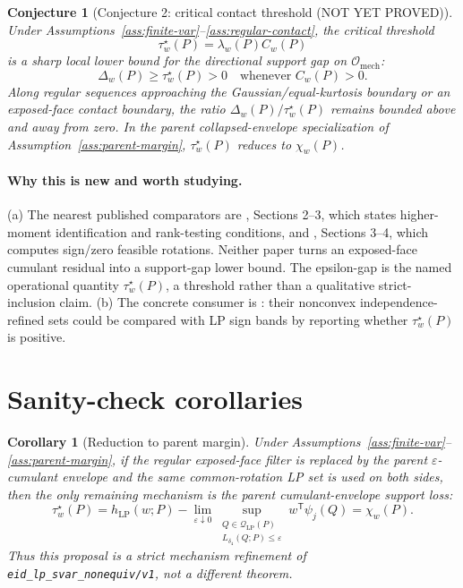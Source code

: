 \documentclass[11pt]{article}
\newcommand{\transpose}{\mathsf{T}}
\theoremstyle{definition}
\theoremstyle{plain}
\newtheorem{conjecture}{Conjecture}
\newtheorem{corollary}{Corollary}
\theoremstyle{remark}
\begin{document}
\begin{conjecture}[Conjecture 2: critical contact threshold (NOT YET PROVED)]\label{conj:critical-threshold}
Under Assumptions~\ref{ass:finite-var}--\ref{ass:regular-contact}, the critical threshold
\[
\tau_w^\star(P)=\lambda_w(P)C_w(P)
\]
is a sharp local lower bound for the directional support gap on \(\mathcal O_{\mathrm{mech}}\):
\[
\Delta_w(P)\ge \tau_w^\star(P)>0\quad\text{whenever }C_w(P)>0.
\]
Along regular sequences approaching the Gaussian/equal-kurtosis boundary or an exposed-face contact boundary, the ratio \(\Delta_w(P)/\tau_w^\star(P)\) remains bounded above and away from zero.  In the parent collapsed-envelope specialization of Assumption~\ref{ass:parent-margin}, \(\tau_w^\star(P)\) reduces to \(\chi_w(P)\).
\end{conjecture}
\paragraph{Why this is new and worth studying.}
(a) The nearest published comparators are \citet{Guay2021}, Sections 2--3, which states higher-moment identification and rank-testing conditions, and \citet{Read2022}, Sections 3--4, which computes sign/zero feasible rotations.  Neither paper turns an exposed-face cumulant residual into a support-gap lower bound.  The epsilon-gap is the named operational quantity \(\tau_w^\star(P)\), a threshold rather than a qualitative strict-inclusion claim.  (b) The concrete consumer is \citet{DrautzburgWright2023}: their nonconvex independence-refined sets could be compared with LP sign bands by reporting whether \(\tau_w^\star(P)\) is positive.

\section{Sanity-check corollaries}
\begin{corollary}[Reduction to parent margin]\label{cor:parent}
Under Assumptions~\ref{ass:finite-var}--\ref{ass:parent-margin}, if the regular exposed-face filter is replaced by the parent \(\varepsilon\)-cumulant envelope and the same common-rotation LP set is used on both sides, then the only remaining mechanism is the parent cumulant-envelope support loss:
\[
\tau_w^\star(P)=
h_{\mathrm{LP}}(w;P)-
\lim_{\varepsilon\downarrow0}
\sup_{\substack{Q\in\mathcal Q_{\mathrm{LP}}(P)\\L_{\delta_4}(Q;P)\le\varepsilon}}
w^\transpose\psi_j(Q)=\chi_w(P).
\]
Thus this proposal is a strict mechanism refinement of \texttt{eid\_lp\_svar\_nonequiv/v1}, not a different theorem.
\end{corollary}
\end{document}

